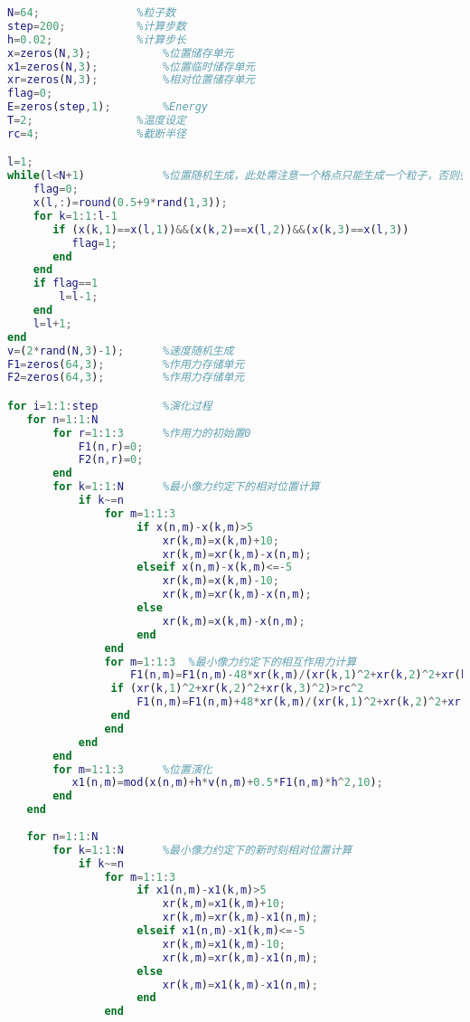 \documentclass{article}
\begin{document}
\begin{lstlisting}[language=MATLAB]
N=64;				%粒子数
step=200;			%计算步数
h=0.02;				%计算步长
x=zeros(N,3);			%位置储存单元
x1=zeros(N,3);			%位置临时储存单元
xr=zeros(N,3);			%相对位置储存单元
flag=0;
E=zeros(step,1);		%Energy
T=2;				%温度设定
rc=4;				%截断半径

l=1;
while(l<N+1)			%位置随机生成，此处需注意一个格点只能生成一个粒子，否则会出现nan
    flag=0;
    x(l,:)=round(0.5+9*rand(1,3));
    for k=1:1:l-1
       if (x(k,1)==x(l,1))&&(x(k,2)==x(l,2))&&(x(k,3)==x(l,3))
          flag=1;
       end
    end
    if flag==1
        l=l-1;
    end
    l=l+1;
end
v=(2*rand(N,3)-1);		%速度随机生成
F1=zeros(64,3);			%作用力存储单元
F2=zeros(64,3);			%作用力存储单元

for i=1:1:step			%演化过程
   for n=1:1:N
       for r=1:1:3		%作用力的初始置0
           F1(n,r)=0;
           F2(n,r)=0;
       end
       for k=1:1:N		%最小像力约定下的相对位置计算
           if k~=n
               for m=1:1:3
                    if x(n,m)-x(k,m)>5
                        xr(k,m)=x(k,m)+10;
                        xr(k,m)=xr(k,m)-x(n,m);
                    elseif x(n,m)-x(k,m)<=-5
                        xr(k,m)=x(k,m)-10;
                        xr(k,m)=xr(k,m)-x(n,m);
                    else
                        xr(k,m)=x(k,m)-x(n,m);
                    end
               end
               for m=1:1:3	%最小像力约定下的相互作用力计算
                   F1(n,m)=F1(n,m)-48*xr(k,m)/(xr(k,1)^2+xr(k,2)^2+xr(k,3)^2)^7+24*xr(k,m)/(xr(k,1)^2+xr(k,2)^2+xr(k,3)^2)^4;
                if (xr(k,1)^2+xr(k,2)^2+xr(k,3)^2)>rc^2
                	F1(n,m)=F1(n,m)+48*xr(k,m)/(xr(k,1)^2+xr(k,2)^2+xr(k,3)^2)^7-24*xr(k,m)/(xr(k,1)^2+xr(k,2)^2+xr(k,3)^2)^4;	%截断修正
                end
               end
           end
       end
       for m=1:1:3		%位置演化
          x1(n,m)=mod(x(n,m)+h*v(n,m)+0.5*F1(n,m)*h^2,10); 
       end
   end
   
   for n=1:1:N
       for k=1:1:N		%最小像力约定下的新时刻相对位置计算
           if k~=n
               for m=1:1:3
                    if x1(n,m)-x1(k,m)>5
                        xr(k,m)=x1(k,m)+10;
                        xr(k,m)=xr(k,m)-x1(n,m);
                    elseif x1(n,m)-x1(k,m)<=-5
                        xr(k,m)=x1(k,m)-10;
                        xr(k,m)=xr(k,m)-x1(n,m);
                    else
                        xr(k,m)=x1(k,m)-x1(n,m);
                    end
               end
           

\end{lstlisting}
\end{document}
